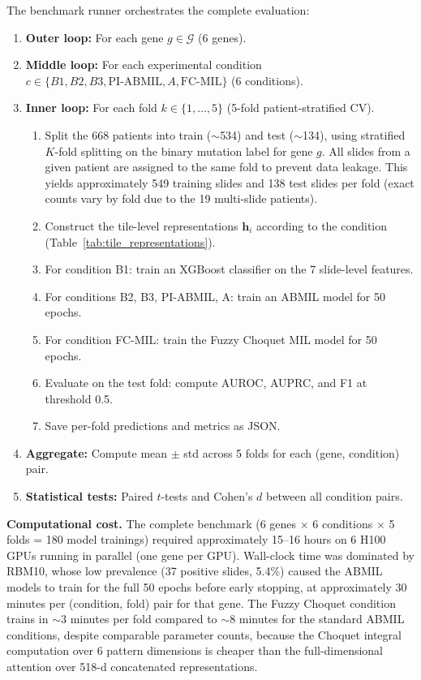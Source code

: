 The benchmark runner orchestrates the complete evaluation:

\begin{enumerate}
    \item \textbf{Outer loop:} For each gene $g \in \mathcal{G}$
    (6 genes).
    \item \textbf{Middle loop:} For each experimental condition
    $c \in \{B1, B2, B3, \text{PI-ABMIL}, A, \text{FC-MIL}\}$ (6 conditions).
    \item \textbf{Inner loop:} For each fold $k \in \{1, \ldots, 5\}$
    (5-fold patient-stratified CV).
    \begin{enumerate}
        \item Split the 668 patients into train ($\sim$534) and test
        ($\sim$134), using stratified $K$-fold splitting on
        the binary mutation label for gene $g$.
        All slides from a given patient are assigned to the same
        fold to prevent data leakage.
        This yields approximately 549 training slides and 138 test
        slides per fold (exact counts vary by fold due to the
        19 multi-slide patients).
        \item Construct the tile-level representations $\mathbf{h}_i$
        according to the condition
        (Table~\ref{tab:tile_representations}).
        \item For condition B1: train an XGBoost classifier on the
        7 slide-level features.
        \item For conditions B2, B3, PI-ABMIL, A: train an ABMIL model for
        50 epochs.
        \item For condition FC-MIL: train the Fuzzy Choquet MIL model for
        50 epochs.
        \item Evaluate on the test fold: compute AUROC, AUPRC,
        and F1 at threshold 0.5.
        \item Save per-fold predictions and metrics as JSON.
    \end{enumerate}
    \item \textbf{Aggregate:} Compute mean $\pm$ std across 5 folds
    for each (gene, condition) pair.
    \item \textbf{Statistical tests:} Paired $t$-tests and Cohen's $d$
    between all condition pairs.
\end{enumerate}

\textbf{Computational cost.}
The complete benchmark (6 genes $\times$ 6 conditions $\times$ 5 folds
= 180 model trainings) required approximately 15--16 hours on 6
H100 GPUs running in parallel (one gene per GPU).
Wall-clock time was dominated by RBM10, whose low prevalence (37
positive slides, 5.4\%) caused the ABMIL models to train for the full
50 epochs before early stopping, at approximately 30 minutes per
(condition, fold) pair for that gene.
The Fuzzy Choquet condition trains in $\sim$3 minutes per fold
compared to $\sim$8 minutes for the standard ABMIL conditions,
despite comparable parameter counts, because the Choquet integral
computation over 6 pattern dimensions is cheaper than the
full-dimensional attention over 518-d concatenated representations.



